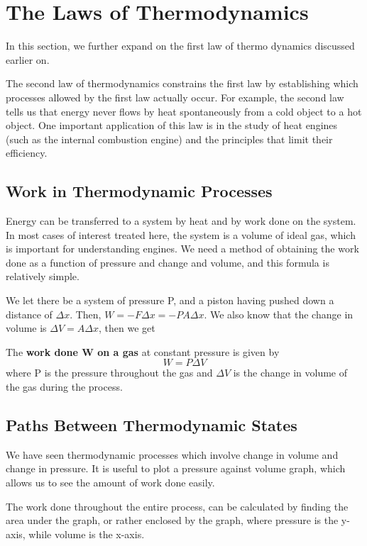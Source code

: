 \section{The Laws of Thermodynamics}
In this section, we further expand on the first law of thermo dynamics discussed earlier on.

The second law of thermodynamics constrains the first law by establishing which processes allowed by the first law actually occur. For example, the second law tells us that energy never flows by heat spontaneously from a cold object to a hot object. One important application of this law is in the study of heat engines (such as the internal combustion engine) and the principles that limit their efficiency.
\subsection{Work in Thermodynamic Processes}
Energy can be transferred to a system by heat and by work done on the system. In most cases of interest treated here, the system is a volume of ideal gas, which is important for understanding engines. We need a method of obtaining the work done as a function of pressure and change and volume, and this formula is relatively simple.

We let there be a system of pressure P, and a piston having pushed down a distance of $\Delta x$. Then,
$W=-F\Delta x=-PA\Delta x$. We also know that the change in volume is $\Delta V=A\Delta x$, then we get

\begin{form}
The \textbf{work done W on a gas} at constant pressure is given by
$$W=P\Delta V$$
where P is the pressure throughout the gas and $\Delta V$ is the change in volume of the gas during the process.
\end{form}

\subsection{Paths Between Thermodynamic States}
We have seen thermodynamic processes which involve change in volume and change in pressure. It is useful to plot a pressure against volume graph, which allows us to see the amount of work done easily.

The work done throughout the entire process, can be calculated by finding the area under the graph, or rather enclosed by the graph, where pressure is the y-axis, while volume is the x-axis.

